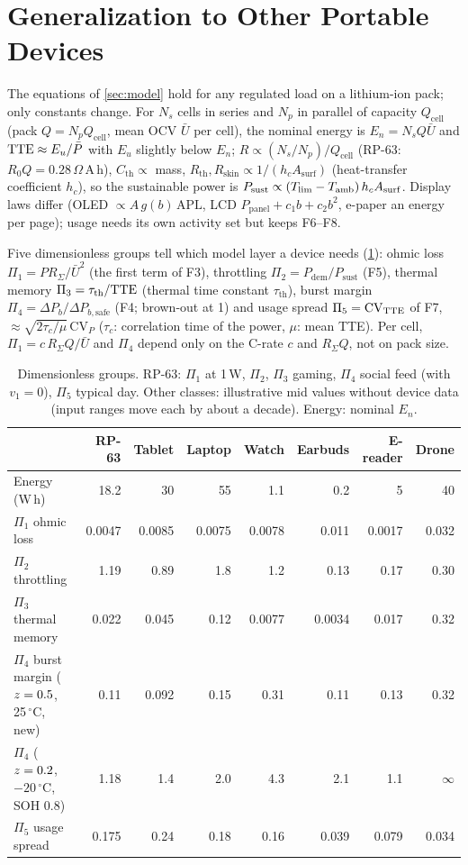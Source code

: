\section{Generalization to Other Portable Devices}\label{sec:general}
The equations of \cref{sec:model} hold for any regulated load on a lithium-ion pack; only constants change. For
$N_s$ cells in series and $N_p$ in parallel of capacity $Q_{\mathrm{cell}}$ (pack $Q=N_pQ_{\mathrm{cell}}$, mean OCV
$\bar U$ per cell), the nominal energy is $E_n=N_sQ\bar U$ and $\mathrm{TTE}\approx E_u/\bar P$ with $E_u$ slightly below
$E_n$; $R\propto(N_s/N_p)/Q_{\mathrm{cell}}$ (RP-63: $R_0Q=0.28\,\Omega$\,A\,h), $C_{\mathrm{th}}\propto$ mass,
$R_{\mathrm{th}},R_{\mathrm{skin}}\propto1/(h_cA_{\mathrm{surf}})$ (heat-transfer coefficient $h_c$), so the
sustainable power is $P_{\mathrm{sust}}\propto(T_{\lim}-T_{\mathrm{amb}})\,h_cA_{\mathrm{surf}}$. Display laws differ
(OLED $\propto A\,g(b)\,\mathrm{APL}$, LCD $P_{\mathrm{panel}}+c_1b+c_2b^2$, e-paper an energy per page); usage
needs its own activity set but keeps F6--F8.

Five dimensionless groups tell which model layer a device needs (\cref{tab:general}): ohmic loss
$\Pi_1=PR_\Sigma/\bar U^2$ (the first term of F3), throttling $\Pi_2=P_{\mathrm{dem}}/P_{\mathrm{sust}}$ (F5),
thermal memory $\Pi_3=\tau_{\mathrm{th}}/\mathrm{TTE}$ (thermal time constant $\tau_{\mathrm{th}}$), burst margin
$\Pi_4=\Delta P_b/\Delta P_{b,\mathrm{safe}}$ (F4; brown-out at 1) and usage spread $\Pi_5=\mathrm{CV}_{\mathrm{TTE}}$ of F7,
$\approx\sqrt{2\tau_c/\mu}\,\mathrm{CV}_P$ ($\tau_c$: correlation time of the power, $\mu$: mean TTE). Per cell,
$\Pi_1=c\,R_\Sigma Q/\bar U$ and $\Pi_4$ depend only on the C-rate $c$ and $R_\Sigma Q$, not on pack size.

\begin{table}[t]\centering\small
\caption{Dimensionless groups. RP-63: $\Pi_1$ at 1\,W, $\Pi_2$, $\Pi_3$ gaming, $\Pi_4$ social feed (with $v_1=0$),
$\Pi_5$ typical day. Other classes: illustrative mid values without device data (input ranges move each by about
a decade). Energy: nominal $E_n$.}
\label{tab:general}
\setlength{\tabcolsep}{4.5pt}
\begin{tabular}{@{}lrrrrrrr@{}}
\toprule
 & RP-63 & Tablet & Laptop & Watch & Earbuds & E-reader & Drone \\
\midrule
Energy (W\,h) & 18.2 & 30 & 55 & 1.1 & 0.2 & 5 & 40 \\
$\Pi_1$ ohmic loss & 0.0047 & 0.0085 & 0.0075 & 0.0078 & 0.011 & 0.0017 & 0.032 \\
$\Pi_2$ throttling & 1.19 & 0.89 & 1.8 & 1.2 & 0.13 & 0.17 & 0.30 \\
$\Pi_3$ thermal memory & 0.022 & 0.045 & 0.12 & 0.0077 & 0.0034 & 0.017 & 0.32 \\
$\Pi_4$ burst margin ($z=0.5$, 25\,$^\circ$C, new) & 0.11 & 0.092 & 0.15 & 0.31 & 0.11 & 0.13 & 0.32 \\
$\Pi_4$ ($z=0.2$, $-20\,^\circ$C, SOH 0.8) & 1.18 & 1.4 & 2.0 & 4.3 & 2.1 & 1.1 & $\infty$ \\
$\Pi_5$ usage spread & 0.175 & 0.24 & 0.18 & 0.16 & 0.039 & 0.079 & 0.034 \\
\bottomrule
\end{tabular}
\end{table}

